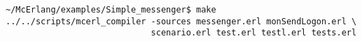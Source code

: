 \begin{verbatim}
~/McErlang/examples/Simple_messenger$ make
../../scripts/mcerl_compiler -sources messenger.erl monSendLogon.erl \
                             scenario.erl test.erl testl.erl tests.erl
\end{verbatim}
